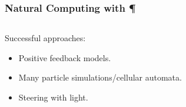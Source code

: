 \documentclass[	hyperref={pdfpagelabels=false}, xcolor=dvipsnames,
		11pt]{beamer}
\begin{document}
\begin{frame}
    \frametitle{Natural Computing with \P} 

	\begin{columns}
	\begin{column}{4.6cm}

	\begin{overprint}

		\begin{block}{Successful approaches:}
		  \begin{itemize}
		   \item<1> Positive feedback models.
		   \item<2> Many particle simulations/cellular automata. 
		   \item<3> Steering with light.
		  \end{itemize}
		\end{block}

	\end{overprint}

	\end{column}

	\begin{column}{5cm}
	\begin{overprint}

	\testbox{
	\begin{minipage}[t]{5 cm}


\end{minipage}}
\end{overprint}
\end{column}
\end{columns}
\end{frame}
\end{document}
